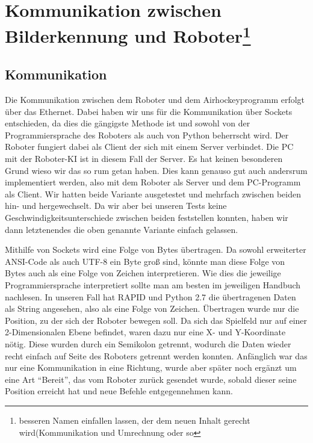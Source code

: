 
\chapter{Kommunikation zwischen Bilderkennung und Roboter\footnote{besseren Namen einfallen lassen, der dem neuen Inhalt gerecht wird(Kommunikation und Umrechnung oder so}}
\label{cha:Kommunikation zwischen Bilderkennung und Roboter}
\section{Kommunikation}
Die Kommunikation zwischen dem Roboter und dem Airhockeyprogramm erfolgt über das Ethernet. Dabei haben wir uns für die Kommunikation über Sockets entschieden, da dies die gängigste Methode ist und sowohl von der Programmiersprache des Roboters als auch von Python beherrscht wird. Der Roboter fungiert dabei als Client der sich mit einem Server verbindet. Die PC mit der Roboter-KI ist in diesem Fall der Server. Es hat keinen besonderen Grund wieso wir das so rum getan haben. Dies kann genauso gut auch andersrum implementiert werden, also mit dem Roboter als Server und dem PC-Programm als Client. Wir hatten beide Variante ausgetestet und mehrfach zwischen beiden hin- und hergewechselt. Da wir aber bei unseren Tests keine Geschwindigkeitsunterschiede zwischen beiden feststellen konnten, haben wir dann letztenendes die oben genannte Variante einfach gelassen.

Mithilfe von Sockets wird eine Folge von Bytes übertragen. Da sowohl erweiterter ANSI-Code als auch UTF-8 ein Byte groß sind, könnte man diese Folge von Bytes auch als eine Folge von Zeichen interpretieren. Wie dies die jeweilige Programmiersprache interpretiert sollte man am besten im jeweiligen Handbuch nachlesen. In unseren Fall hat RAPID und Python 2.7 die übertragenen Daten als String angesehen, also als eine Folge von Zeichen. 
Übertragen wurde nur die Position, zu der sich der Roboter bewegen soll.  Da sich das Spielfeld nur auf einer 2-Dimensionalen Ebene befindet, waren dazu nur eine X- und Y-Koordinate nötig. Diese wurden durch ein Semikolon getrennt, wodurch die Daten wieder recht einfach auf Seite des Roboters getrennt werden konnten. Anfänglich war das nur eine Kommunikation in eine Richtung, wurde aber später noch ergänzt um eine Art \enquote{Bereit}, das vom Roboter zurück gesendet wurde, sobald dieser seine Position erreicht hat und neue Befehle entgegennehmen kann. 

